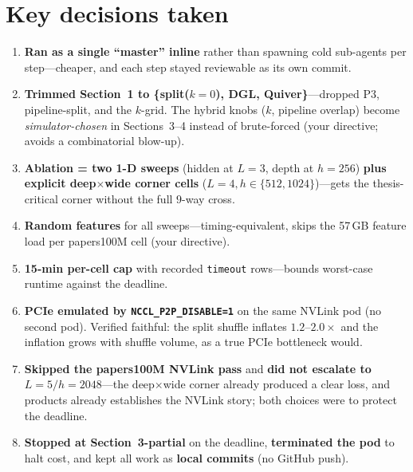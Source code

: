 \section*{Key decisions taken}
\begin{enumerate}
\item \textbf{Ran as a single ``master'' inline} rather than spawning cold sub-agents per
step---cheaper, and each step stayed reviewable as its own commit.
\item \textbf{Trimmed Section~1 to \{split($k{=}0$), DGL, Quiver\}}---dropped P3,
pipeline-split, and the $k$-grid. The hybrid knobs ($k$, pipeline overlap) become
\emph{simulator-chosen} in Sections~3--4 instead of brute-forced (your directive; avoids a
combinatorial blow-up).
\item \textbf{Ablation = two 1-D sweeps} (hidden at $L{=}3$, depth at $h{=}256$)
\textbf{plus explicit deep$\times$wide corner cells} ($L{=}4, h\in\{512,1024\}$)---gets the
thesis-critical corner without the full $9$-way cross.
\item \textbf{Random features} for all sweeps---timing-equivalent, skips the 57\,GB
feature load per papers100M cell (your directive).
\item \textbf{15-min per-cell cap} with recorded \texttt{timeout} rows---bounds worst-case
runtime against the deadline.
\item \textbf{PCIe emulated by \texttt{NCCL\_P2P\_DISABLE=1}} on the same NVLink pod (no
second pod). Verified faithful: the split shuffle inflates $1.2$--$2.0\times$ and the
inflation grows with shuffle volume, as a true PCIe bottleneck would.
\item \textbf{Skipped the papers100M NVLink pass} and \textbf{did not escalate to
$L{=}5/h{=}2048$}---the deep$\times$wide corner already produced a clear loss, and products
already establishes the NVLink story; both choices were to protect the deadline.
\item \textbf{Stopped at Section~3-partial} on the deadline, \textbf{terminated the pod}
to halt cost, and kept all work as \textbf{local commits} (no GitHub push).
\end{enumerate}

